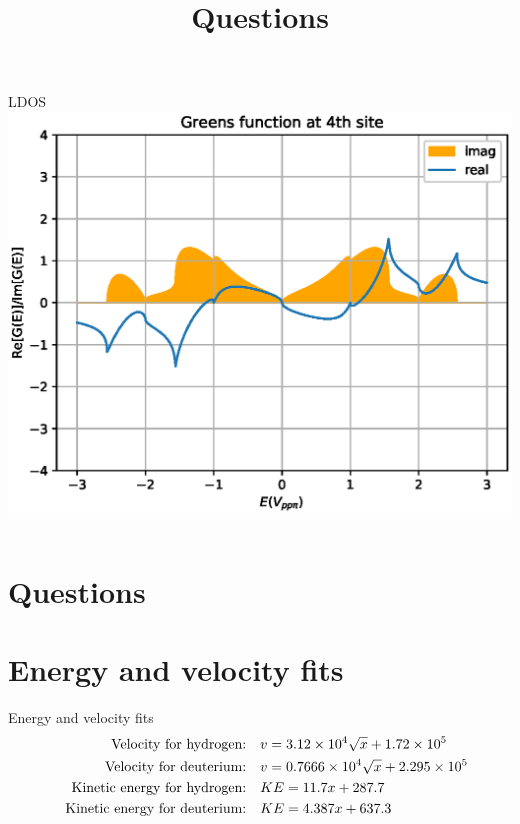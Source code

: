 \documentclass[hyperref={colorlinks=true,urlcolor=blue,linkcolor=.},aspectratio=1610,mathserif]{beamer}
\newcommand{\im}[3]{\inputminted[linenos=true, python3=true, firstline=#2, lastline=#3]{python}{#1}}
\begin{document}
\begin{frame}{LDOS}
\centering
    \includegraphics[width=.7\textwidth]{Figures/BetaimrealTE.eps}
	    \im{Listings/SelfEnergyByRecursion.py}{64}{68}
\end{frame}

\section*{Questions}
\title{Questions}
\subtitle{}
\begin{frame}
	\titlepage
\end{frame}

\appendix
\section{Energy and velocity fits}
\begin{frame}{Energy and velocity fits}
	\begin{align}
		\qq{Velocity for hydrogen:}        & v = 3.12\times10^4 \sqrt{x}+1.72\times10^5   \nonumber \\
		\qq{Velocity for deuterium:}       & v = 0.7666\times10^4\sqrt{x}+2.295\times10^5 \nonumber \\
		\qq{Kinetic energy for hydrogen:}  & KE = 11.7x+287.7                             \nonumber \\
		\qq{Kinetic energy for deuterium:} & KE = 4.387x+637.3 \nonumber
	\end{align}
\end{frame}
\end{document}
